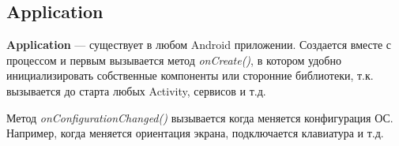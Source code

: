 \subsection{Application}
\textbf{Application} --- существует в любом Android приложении. 
Создается вместе с процессом и первым вызывается метод \textit{onCreate()}, в котором удобно инициализировать собственные компоненты или сторонние библиотеки, т.к. вызывается до старта любых Activity, сервисов и т.д.

Метод \textit{onConfigurationChanged()} вызывается когда меняется конфигурация ОС. Например, когда меняется ориентация экрана, подключается клавиатура и т.д.